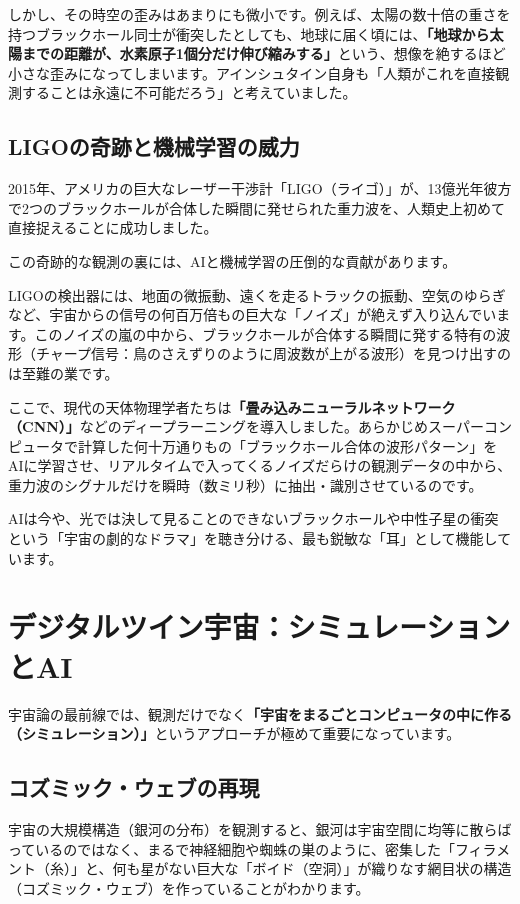 しかし、その時空の歪みはあまりにも微小です。例えば、太陽の数十倍の重さを持つブラックホール同士が衝突したとしても、地球に届く頃には、\textbf{「地球から太陽までの距離が、水素原子1個分だけ伸び縮みする」}という、想像を絶するほど小さな歪みになってしまいます。アインシュタイン自身も「人類がこれを直接観測することは永遠に不可能だろう」と考えていました。

\subsection{LIGOの奇跡と機械学習の威力}

2015年、アメリカの巨大なレーザー干渉計「LIGO（ライゴ）」が、13億光年彼方で2つのブラックホールが合体した瞬間に発せられた重力波を、人類史上初めて直接捉えることに成功しました。

この奇跡的な観測の裏には、AIと機械学習の圧倒的な貢献があります。

LIGOの検出器には、地面の微振動、遠くを走るトラックの振動、空気のゆらぎなど、宇宙からの信号の何百万倍もの巨大な「ノイズ」が絶えず入り込んでいます。このノイズの嵐の中から、ブラックホールが合体する瞬間に発する特有の波形（チャープ信号：鳥のさえずりのように周波数が上がる波形）を見つけ出すのは至難の業です。

ここで、現代の天体物理学者たちは\textbf{「畳み込みニューラルネットワーク（CNN）」}などのディープラーニングを導入しました。あらかじめスーパーコンピュータで計算した何十万通りもの「ブラックホール合体の波形パターン」をAIに学習させ、リアルタイムで入ってくるノイズだらけの観測データの中から、重力波のシグナルだけを瞬時（数ミリ秒）に抽出・識別させているのです。

AIは今や、光では決して見ることのできないブラックホールや中性子星の衝突という「宇宙の劇的なドラマ」を聴き分ける、最も鋭敏な「耳」として機能しています。

\section{デジタルツイン宇宙：シミュレーションとAI}

宇宙論の最前線では、観測だけでなく\textbf{「宇宙をまるごとコンピュータの中に作る（シミュレーション）」}というアプローチが極めて重要になっています。

\subsection{コズミック・ウェブの再現}

宇宙の大規模構造（銀河の分布）を観測すると、銀河は宇宙空間に均等に散らばっているのではなく、まるで神経細胞や蜘蛛の巣のように、密集した「フィラメント（糸）」と、何も星がない巨大な「ボイド（空洞）」が織りなす網目状の構造（コズミック・ウェブ）を作っていることがわかります。

